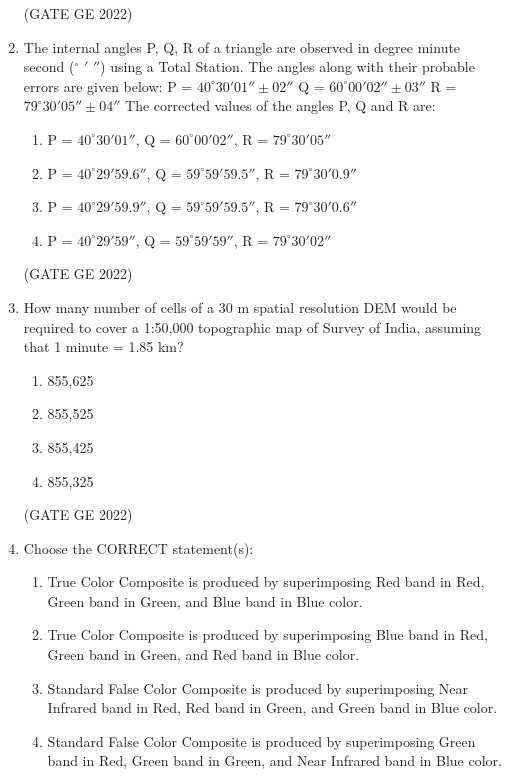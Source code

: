 \documentclass[a4paper, 11pt]{article}
\begin{document}
\begin{enumerate}
\hfill (GATE GE 2022)

\item The internal angles P, Q, R of a triangle are observed in degree minute second ($^\circ$ $'$ $''$) using a Total Station. The angles along with their probable errors are given below:  
P = $40^\circ 30' 01'' \pm 02''$  
Q = $60^\circ 00' 02'' \pm 03''$  
R = $79^\circ 30' 05'' \pm 04''$  
The corrected values of the angles P, Q and R are:
\begin{enumerate}
    \item P = $40^\circ 30' 01''$, Q = $60^\circ 00' 02''$, R = $79^\circ 30' 05''$
    \item P = $40^\circ 29' 59.6''$, Q = $59^\circ 59' 59.5''$, R = $79^\circ 30' 0.9''$
    \item P = $40^\circ 29' 59.9''$, Q = $59^\circ 59' 59.5''$, R = $79^\circ 30' 0.6''$
    \item P = $40^\circ 29' 59''$, Q = $59^\circ 59' 59''$, R = $79^\circ 30' 02''$
\end{enumerate}

\hfill (GATE GE 2022)

\item How many number of cells of a 30 m spatial resolution DEM would be required to cover a 1:50,000 topographic map of Survey of India, assuming that 1 minute = 1.85 km?
\begin{enumerate}
    \item 855,625
    \item 855,525
    \item 855,425
    \item 855,325
\end{enumerate}

\hfill (GATE GE 2022)

\item Choose the CORRECT statement(s):
\begin{enumerate}
    \item True Color Composite is produced by superimposing Red band in Red, Green band in Green, and Blue band in Blue color.
    \item True Color Composite is produced by superimposing Blue band in Red, Green band in Green, and Red band in Blue color.
    \item Standard False Color Composite is produced by superimposing Near Infrared band in Red, Red band in Green, and Green band in Blue color.
    \item Standard False Color Composite is produced by superimposing Green band in Red, Green band in Green, and Near Infrared band in Blue color.
\end{enumerate}


\end{enumerate}
\end{document}
